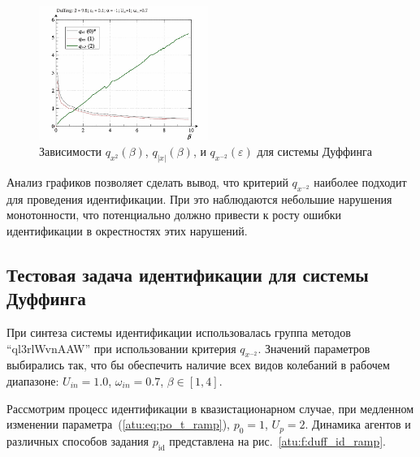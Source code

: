\begin{figure}[ht!]
\begin{center}
  \includegraphics[width=0.49\textwidth]{p/cha/duff/duff_q-p_q_1x00_0x70.png}
\end{center}
  \caption{Зависимости $q_{x^2}(\beta)$, $q_{|x|}(\beta)$,  и $q_{x^{-2}}(\varepsilon) $ для системы Дуффинга}
\label{atu:f:duff_q}
\end{figure}

Анализ графиков позволяет сделать вывод, что критерий $q_{x^{-2}}$
наиболее подходит для проведения идентификации. При это наблюдаются
небольшие нарушения монотонности, что потенциально должно привести к
росту ошибки идентификации в окрестностях этих нарушений.




\subsection{Тестовая задача идентификации для системы Дуффинга}  %

При синтеза системы идентификации использовалась группа методов ``ql3rlWvnAAW''
при использовании критерия $q_{x^{-2}}$.
Значений параметров выбирались так, что бы обеспечить
наличие всех видов колебаний в рабочем диапазоне:
$U_{in}=1.0$, $\omega_{in}=0.7$, $ \beta \in [1, 4]$.

Рассмотрим процесс идентификации
в квазистационарном случае,
при медленном изменении параметра~(\ref{atu:eq:po_t_ramp}), $p_0=1$, $U_p=2$.
Динамика агентов и различных способов задания $p_\mathrm{id}$
представлена на рис.~\ref{atu:f:duff_id_ramp}.

